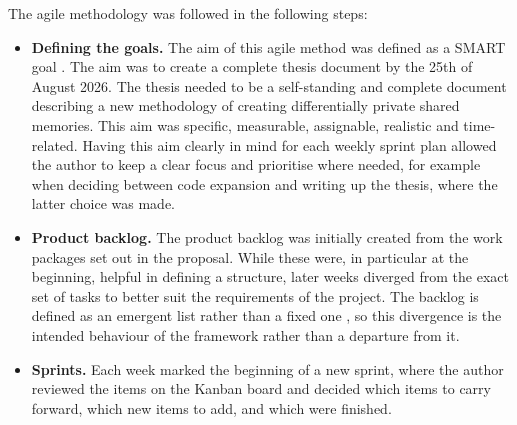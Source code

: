 The agile methodology was followed in the following steps:
\begin{itemize}
    \item \textbf{Defining the goals.} The aim of this agile method was defined
    as a SMART goal \citep{doran1981smart}. The aim was to create a complete
    thesis document by the 25th of August 2026. The thesis needed to be a
    self-standing and complete document describing a new methodology of creating
    differentially private shared memories. This aim was specific, measurable,
    assignable, realistic and time-related. Having this aim clearly in mind for
    each weekly sprint plan allowed the author to keep a clear focus and
    prioritise where needed, for example when deciding between code expansion
    and writing up the thesis, where the latter choice was made.

    \item \textbf{Product backlog.} The product backlog was initially created
    from the work packages set out in the proposal. While these were, in
    particular at the beginning, helpful in defining a structure, later weeks
    diverged from the exact set of tasks to better suit the requirements of the
    project. The backlog is defined as an emergent list rather than a fixed one
    \citep{schwaber2020scrum}, so this divergence is the intended behaviour of
    the framework rather than a departure from it.

    \item \textbf{Sprints.} Each week marked the beginning of a new sprint,
    where the author reviewed the items on the Kanban board and decided which
    items to carry forward, which new items to add, and which were finished.


\end{itemize}
